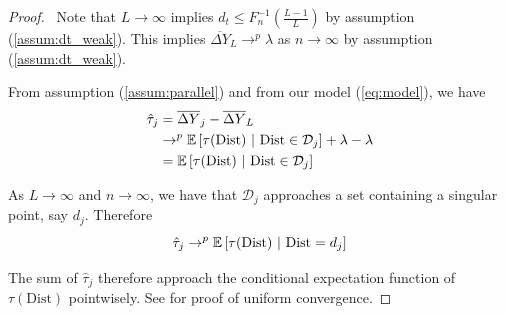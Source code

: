 \documentclass[10pt]{article}
\newcommand{\dist}{\text{Dist}}
\begin{document}
\begin{proof}
    \ Note that $L \to \infty$ implies $d_t \leq F_n^{-1}(\frac{L-1}{L})$ by assumption (\ref{assum:dt_weak}). This implies $\overline{\Delta Y}_L \to^p \lambda$ as $n \to \infty$ by assumption (\ref{assum:dt_weak}). 
    
    From assumption (\ref{assum:parallel}) and from our model (\ref{eq:model}), we have
    \begin{align*}
        \hat{\tau}_j &= \overline{\Delta Y}_j - \overline{\Delta Y}_L \\
        &\to^p \condexpec{\tau(\dist)}{\dist \in \mathcal{D}_j} + \lambda - \lambda \\
        &= \condexpec{\tau(\dist)}{\dist \in \mathcal{D}_j}
    \end{align*}

    As $L \to \infty$ and $n \to \infty$, we have that $\mathcal{D}_j$ approaches a set containing a singular point, say $d_j$. Therefore 
    $$ 
        \hat{\tau}_j \to^p \condexpec{\tau(\dist)}{\dist = d_j}
    $$

    The sum of $\hat{\tau}_j$ therefore approach the conditional expectation function of $\tau(\dist)$ pointwisely. See \citet{Cattaneo_Farrell_Feng_2019} for proof of uniform convergence.
\end{proof}






\end{document}
